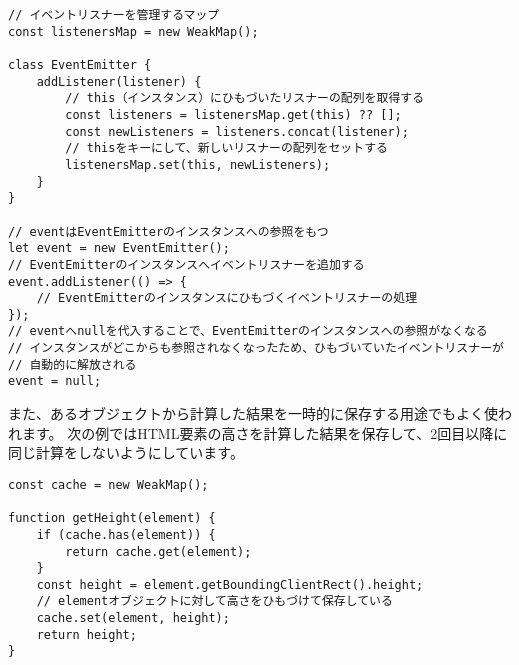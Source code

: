 \begin{lstlisting}
// イベントリスナーを管理するマップ
const listenersMap = new WeakMap();

class EventEmitter {
    addListener(listener) {
        // this（インスタンス）にひもづいたリスナーの配列を取得する
        const listeners = listenersMap.get(this) ?? [];
        const newListeners = listeners.concat(listener);
        // thisをキーにして、新しいリスナーの配列をセットする
        listenersMap.set(this, newListeners);
    }
}

// eventはEventEmitterのインスタンスへの参照をもつ
let event = new EventEmitter();
// EventEmitterのインスタンスへイベントリスナーを追加する
event.addListener(() => {
    // EventEmitterのインスタンスにひもづくイベントリスナーの処理
});
// eventへnullを代入することで、EventEmitterのインスタンスへの参照がなくなる
// インスタンスがどこからも参照されなくなったため、ひもづいていたイベントリスナーが
// 自動的に解放される
event = null;
\end{lstlisting}

また、あるオブジェクトから計算した結果を一時的に保存する用途でもよく使われます。
次の例ではHTML要素の高さを計算した結果を保存して、2回目以降に同じ計算をしないようにしています。

\begin{lstlisting}
const cache = new WeakMap();

function getHeight(element) {
    if (cache.has(element)) {
        return cache.get(element);
    }
    const height = element.getBoundingClientRect().height;
    // elementオブジェクトに対して高さをひもづけて保存している
    cache.set(element, height);
    return height;
}
\end{lstlisting}

